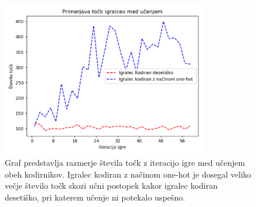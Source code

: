 \documentclass[a4paper, 12pt]{book}
\begin{document}
\begin{figure}[h!]
	\begin{center}
		\includegraphics[width=0.8\textwidth]{photos/onehot_numeric_score.pdf}
	\end{center}
	\caption{Graf predstavlja razmerje števila točk z iteracijo igre med učenjem obeh kodirnikov.
		Igralec kodiran z načinom one-hot je dosegal veliko večje število točk skozi učni postopek kakor igralec kodiran desetiško, pri katerem učenje ni potekalo uspešno.}
	\label{onehot_numeric_score}
\end{figure}
\end{document}
